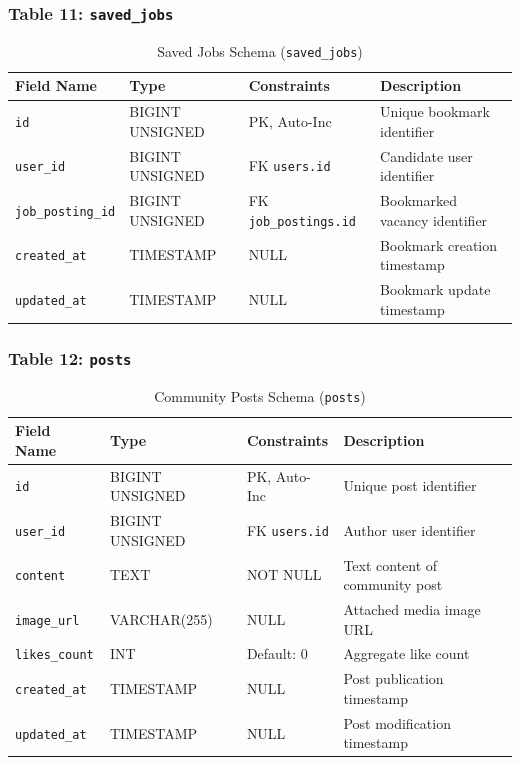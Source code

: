 \subsubsection{Table 11: \texttt{saved\_jobs}}
\begin{table}[H]
\centering
\small
\caption{Saved Jobs Schema (\texttt{saved\_jobs})}
\label{tab:schema_saved_jobs}
\begin{tabular}{|p{3cm}|p{2.8cm}|p{2.2cm}|p{5.5cm}|}
\hline
\textbf{Field Name} & \textbf{Type} & \textbf{Constraints} & \textbf{Description} \\ \hline
\texttt{id} & BIGINT UNSIGNED & PK, Auto-Inc & Unique bookmark identifier \\ \hline
\texttt{user\_id} & BIGINT UNSIGNED & FK \texttt{users.id} & Candidate user identifier \\ \hline
\texttt{job\_posting\_id}& BIGINT UNSIGNED & FK \texttt{job\_postings.id}& Bookmarked vacancy identifier \\ \hline
\texttt{created\_at} & TIMESTAMP & NULL & Bookmark creation timestamp \\ \hline
\texttt{updated\_at} & TIMESTAMP & NULL & Bookmark update timestamp \\ \hline
\end{tabular}
\end{table}

\subsubsection{Table 12: \texttt{posts}}
\begin{table}[H]
\centering
\small
\caption{Community Posts Schema (\texttt{posts})}
\label{tab:schema_posts}
\begin{tabular}{|p{3cm}|p{2.8cm}|p{2.2cm}|p{5.5cm}|}
\hline
\textbf{Field Name} & \textbf{Type} & \textbf{Constraints} & \textbf{Description} \\ \hline
\texttt{id} & BIGINT UNSIGNED & PK, Auto-Inc & Unique post identifier \\ \hline
\texttt{user\_id} & BIGINT UNSIGNED & FK \texttt{users.id} & Author user identifier \\ \hline
\texttt{content} & TEXT & NOT NULL & Text content of community post \\ \hline
\texttt{image\_url} & VARCHAR(255) & NULL & Attached media image URL \\ \hline
\texttt{likes\_count} & INT & Default: 0 & Aggregate like count \\ \hline
\texttt{created\_at} & TIMESTAMP & NULL & Post publication timestamp \\ \hline
\texttt{updated\_at} & TIMESTAMP & NULL & Post modification timestamp \\ \hline
\end{tabular}
\end{table}

